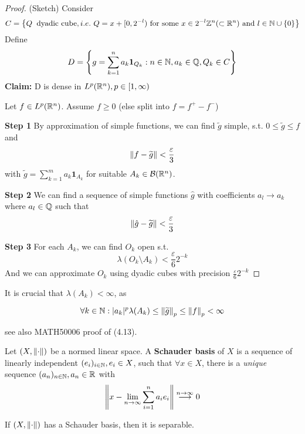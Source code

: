 \documentclass{article}
\begin{document}
\begin{proof}
    (Sketch)  Consider  
    $$
    C = \left\{Q\: \text{\ dyadic\ cube}, i.e. \ Q = x + [0, 2^{-l}) \text{\ for\ some\ } x \in 2^{-l} \inte^n(\subset \real^n) \text{\ and\ } l\in \natu \cup \{0\}\right\}
    $$   
    Define  
    $$
    D = \left\{g = \sum_{k=1}^n a_k \mathbf{1}_{Q_k}: n\in \mathbb{N}, a_k \in \mathbb{Q}, Q_k \in C \right\}
    $$
    \textbf{Claim:} D is dense in $L^p(\mathbb{R}^n), p \in [1, \infty)$  

    Let $f \in L^p(\mathbb{R}^n)$. Assume $f \geq 0$ (else split into $f=f^+-f^-$)  

    \textbf{Step 1} By approximation of simple functions, we can find $\widetilde{g}$ simple, s.t. $0 \leq \widetilde{g} \leq f$ and  
    $$
    \left\|{f-\widetilde{g}}\right\| < \frac{\varepsilon}{3}
    $$  
    with $\widetilde{g}=\sum_{k=1}^m a_k \mathbf{1}_{A_k}$ for suitable $A_k \in \mathcal{B}(\mathbb{R}^n)$.  

    \textbf{Step 2} We can find a sequence of simple functions $\hat{g}$ with coefficients $a_l \to a_k$ where $a_l\in \mathbb{Q}$ such that  
    $$
    \left\|{\hat{g}-\widetilde{g}}\right\| < \frac{\varepsilon}{3}
    $$  

    \textbf{Step 3} For each $A_k$, we can find $O_k$ open s.t.  
    $$
    \lambda(O_k\setminus A_k) < \frac{\varepsilon}{6} 2^{-k}
    $$
    And we can approximate $O_k$ using dyadic cubes with precision $\frac{\varepsilon}{6} 2^{-k}$
\end{proof}  

It is crucial that $\lambda(A_k) < \infty$, as  

$$
\forall k \in \mathbb{N}: |a_k|^p \lambda(A_k) \leq \left\|{\widetilde{g}}\right\|_p \leq \left\|{f}\right\|_p < \infty
$$  

see also MATH50006 proof of (4.13). 

\begin{definition}

Let $(X,\left\|{\cdot}\right\|)$ be a normed linear space. A \textbf{Schauder basis} of $X$ is a sequence of linearly independent $(e_i)_{i\in \mathbb{N}}, e_i \in X$, such that $\forall x \in X$,  there is a \textit{unique} sequence $(a_n)_{n\in \mathbb{N}}, a_n \in \mathbb{R}$ with
$$
\left\|{x - \lim_{n\to\infty}\sum_{i=1}^n a_i e_i}\right\| \overset{n\to \infty}{\longrightarrow} 0
$$
\end{definition}


\begin{proposition}
\label{Schauder implies separability}
	If $(X, \left\|{\cdot}\right\|)$ has a Schauder basis, then it is separable.
\end{proposition}  
\end{document}
